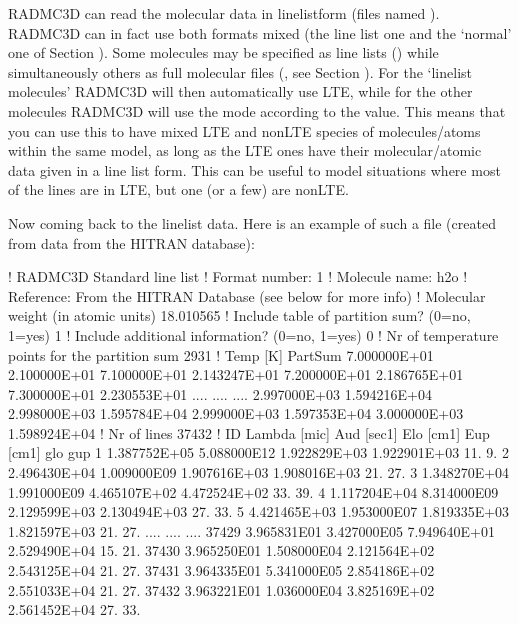 \documentclass[letterpaper,10pt,english]{sphinxmanual}
\begin{document}
RADMC\sphinxhyphen{}3D can read the molecular data in line\sphinxhyphen{}list\sphinxhyphen{}form (files named
). RADMC\sphinxhyphen{}3D can in fact use both formats mixed (the line
list one and the ‘normal’ one of Section {\hyperref[\detokenize{lineradtrans:sec-molecule-xxx-inp}]{}}). Some
molecules may be specified as line lists () while
simultaneously others as full molecular files (, see Section
{\hyperref[\detokenize{lineradtrans:sec-molecule-xxx-inp}]{}}).  For the ‘linelist molecules’ RADMC\sphinxhyphen{}3D will then
automatically use LTE, while for the other molecules RADMC\sphinxhyphen{}3D will use the mode
according to the  value. This means that you can use this to have
mixed LTE and non\sphinxhyphen{}LTE species of molecules/atoms within the same model, as long
as the LTE ones have their molecular/atomic data given in a line list form. This
can be useful to model situations where most of the lines are in LTE, but one
(or a few) are non\sphinxhyphen{}LTE.

Now coming back to the linelist data. Here is an example of such a file
(created from data from the HITRAN database):

\begin{sphinxVerbatim}[commandchars=\\\{\}]
! RADMC\PYGZhy{}3D Standard line list
! Format number:
1
! Molecule name:
h2o
! Reference: From the HITRAN Database (see below for more info)
! Molecular weight (in atomic units)
  18.010565
! Include table of partition sum? (0=no, 1=yes)
  1
! Include additional information? (0=no, 1=yes)
  0
! Nr of temperature points for the partition sum
    2931
!  Temp [K]      PartSum
 7.000000E+01  2.100000E+01
 7.100000E+01  2.143247E+01
 7.200000E+01  2.186765E+01
 7.300000E+01  2.230553E+01
....
....
....
 2.997000E+03  1.594216E+04
 2.998000E+03  1.595784E+04
 2.999000E+03  1.597353E+04
 3.000000E+03  1.598924E+04
! Nr of lines
  37432
! ID    Lambda [mic]  Aud [sec\PYGZca{}\PYGZhy{}1]  E\PYGZus{}lo [cm\PYGZca{}\PYGZhy{}1]  E\PYGZus{}up [cm\PYGZca{}\PYGZhy{}1]  g\PYGZus{}lo  g\PYGZus{}up
     1  1.387752E+05  5.088000E\PYGZhy{}12  1.922829E+03  1.922901E+03   11.    9.
     2  2.496430E+04  1.009000E\PYGZhy{}09  1.907616E+03  1.908016E+03   21.   27.
     3  1.348270E+04  1.991000E\PYGZhy{}09  4.465107E+02  4.472524E+02   33.   39.
     4  1.117204E+04  8.314000E\PYGZhy{}09  2.129599E+03  2.130494E+03   27.   33.
     5  4.421465E+03  1.953000E\PYGZhy{}07  1.819335E+03  1.821597E+03   21.   27.
....
....
....
 37429  3.965831E\PYGZhy{}01  3.427000E\PYGZhy{}05  7.949640E+01  2.529490E+04   15.   21.
 37430  3.965250E\PYGZhy{}01  1.508000E\PYGZhy{}04  2.121564E+02  2.543125E+04   21.   27.
 37431  3.964335E\PYGZhy{}01  5.341000E\PYGZhy{}05  2.854186E+02  2.551033E+04   21.   27.
 37432  3.963221E\PYGZhy{}01  1.036000E\PYGZhy{}04  3.825169E+02  2.561452E+04   27.   33.
\end{sphinxVerbatim}
\end{document}
